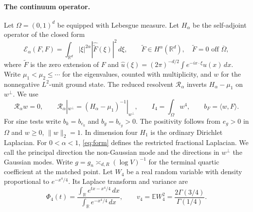 \documentclass[11pt]{article}
\numberwithin{equation}{section}
\newcommand{\E}{\mathbb E}
\newcommand{\R}{\mathbb R}
\newcommand{\ip}[2]{\langle #1,#2\rangle}
\newcommand{\Ga}{\mathcal R_\alpha}
\begin{document}
\paragraph{The continuum operator.}
Let $\Omega = (0,1)^d$ be equipped with Lebesgue measure.
Let $H_\alpha$ be the self-adjoint operator of the closed form
\begin{equation}
 \mathcal E_\alpha(F,F)=\int_{\R^d}|\xi|^{2\alpha}
       |\widehat{\widetilde F}(\xi)|^2\,d\xi ,
 \qquad \widetilde F\in H^\alpha(\R^d),\quad
 \widetilde F=0 \text{ off }\overline\Omega ,
 \label{eq:form}
\end{equation}
where $\widetilde F$ is the zero extension of $F$ and
$\widehat u(\xi)=(2\pi)^{-d/2}\int e^{-ix\cdot\xi}u(x)\,dx$.
Write $\mu_1<\mu_2\le\cdots$ for the eigenvalues, counted with
multiplicity, and $w$ for the nonnegative $L^2$-unit ground state.
The reduced resolvent $\Ga$ inverts $H_\alpha-\mu_1$ on $w^\perp$.
We use
\begin{equation}
 \Ga w=0,\qquad
 \Ga|_{w^\perp}=(H_\alpha-\mu_1)^{-1}|_{w^\perp},\qquad
 I_4=\int_\Omega w^4,\qquad b_F=\ip{w}{F}.
\end{equation}
For sine tests write $b_k=b_{e_k}$ and $b_g=b_{e_g}>0$. The
positivity follows from $e_g>0$ in $\Omega$ and $w\ge0$, $\|w\|_2=1$.
In dimension four $H_1$ is the ordinary Dirichlet Laplacian. For
$0<\alpha<1$, \eqref{eq:form} defines the restricted fractional
Laplacian. We call the principal direction the non-Gaussian mode and the
directions in $w^\perp$ the Gaussian modes.
Write $g=g_n\asymp_{d,R}(\log V)^{-1}$ for the terminal quartic
coefficient at the matched point. Let $W_4$ be a real random variable
with density proportional to $e^{-x^4/4}$. Its Laplace transform
and variance are
\begin{equation}
 \Phi_4(t)=\frac{\int_{\R}e^{tx-x^4/4}\,dx}
                  {\int_{\R}e^{-x^4/4}\,dx},\qquad
 v_4=\E W_4^2=\frac{2\Gamma(3/4)}{\Gamma(1/4)}.
 \label{eq:quartic-transform}
\end{equation}
\end{document}
